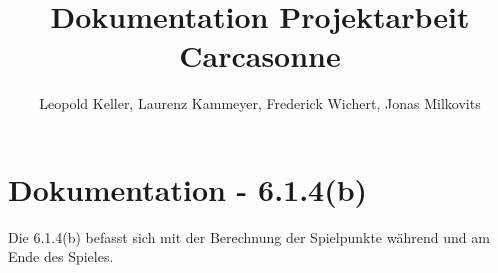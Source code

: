 


\begin{titlepage}
  \title{Dokumentation Projektarbeit Carcasonne} %
  \author{Leopold Keller, Laurenz Kammeyer, Frederick Wichert, Jonas Milkovits}
  \date{}
\end{titlepage}





\maketitle
{} %
\tableofcontents
\clearpage
{} %


\section{Dokumentation - 6.1.4(b)}
Die 6.1.4(b) befasst sich mit der Berechnung der Spielpunkte während und am Ende des Spieles.

